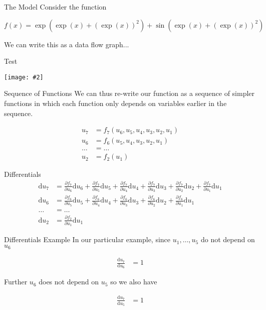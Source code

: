 \documentclass{beamer}
\newcommand {\framedgraphic}[2] {
    \begin{frame}{#1}
        \begin{center}
            \texttt{[image: \#2]}
        \end{center}
    \end{frame}
}
\begin{document}
\begin{frame}[fragile]{The Model}
Consider the function

$$
f(x) = \exp(\exp(x) + (\exp(x))^2) + \sin(\exp(x) + (\exp(x))^2)
$$

We can write this as a data flow graph...
\end{frame}

\framedgraphic{Test}{diagrams/02c0671aa558b88e5ed6f195b22bbd8a.png}

\begin{frame}[fragile]{Sequence of Functions}
We can thus re-write our function as a sequence of simpler functions
in which each function only depends on variables earlier in the
sequence.

$$
\begin{aligned}
u_7    &= f_7(u_6, u_5, u_4, u_3, u_2, u_1) \\
u_6    &= f_6(u_5, u_4, u_3, u_2, u_1) \\
\ldots &= \ldots \\
u_2    &= f_2(u_1)
\end{aligned}
$$
\end{frame}

\begin{frame}[fragile]{Differentials}
$$
\begin{aligned}
\mathrm{d}u_7    &= \frac{\partial f_7}{\partial u_6} \mathrm{d} u_6 +
                    \frac{\partial f_7}{\partial u_5} \mathrm{d} u_5 +
                    \frac{\partial f_7}{\partial u_4} \mathrm{d} u_4 +
                    \frac{\partial f_7}{\partial u_3} \mathrm{d} u_3 +
                    \frac{\partial f_7}{\partial u_2} \mathrm{d} u_2 +
                    \frac{\partial f_7}{\partial u_1} \mathrm{d} u_1 \\
\mathrm{d}u_6    &= \frac{\partial f_6}{\partial u_5} \mathrm{d} u_5 +
                    \frac{\partial f_6}{\partial u_4} \mathrm{d} u_4 +
                    \frac{\partial f_6}{\partial u_3} \mathrm{d} u_3 +
                    \frac{\partial f_6}{\partial u_2} \mathrm{d} u_2 +
                    \frac{\partial f_6}{\partial u_1} \mathrm{d} u_1 \\
\ldots           &= \ldots \\
\mathrm{d}u_2    &= \frac{\partial f_2}{\partial u_1} \mathrm{d} u_1
\end{aligned}
$$
\end{frame}

\begin{frame}[fragile]{Differentials Example}
In our particular example, since $u_1, \dots, u_5$ do not depend on $u_6$

$$
\begin{aligned}
\frac{\mathrm{d}u_7}{\mathrm{d}u_6} &= 1
\end{aligned}
$$

Further $u_6$ does not depend on $u_5$ so we also have

$$
\begin{aligned}
\frac{\mathrm{d}u_7}{\mathrm{d}u_5} &= 1 \\
\end{aligned}
$$
\end{frame}
\end{document}
